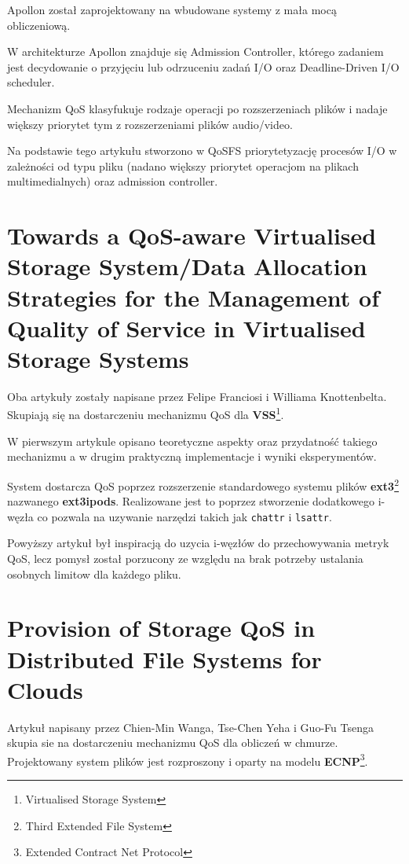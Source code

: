 Apollon został zaprojektowany na wbudowane systemy z mała mocą obliczeniową.

W architekturze Apollon znajduje się Admission Controller,
którego zadaniem jest decydowanie o przyjęciu lub odrzuceniu zadań I/O oraz
Deadline-Driven I/O scheduler.

Mechanizm QoS klasyfukuje rodzaje operacji po rozszerzeniach plików i nadaje większy
priorytet tym z rozszerzeniami plików audio/video.

Na podstawie tego artykułu stworzono w QoSFS priorytetyzację procesów I/O
w zależności od typu pliku (nadano większy priorytet operacjom na plikach multimedialnych) oraz admission controller.

\section{Towards a QoS-aware Virtualised Storage System/Data Allocation Strategies for the Management of Quality of Service in Virtualised Storage Systems}

Oba artykuły zostały napisane przez Felipe Franciosi i Williama Knottenbelta. 
Skupiają się na
dostarczeniu mechanizmu QoS dla \textbf{VSS}\footnote{Virtualised Storage System}.

W pierwszym artykule opisano teoretyczne aspekty oraz przydatność
takiego mechanizmu a w drugim praktyczną implementacje i wyniki eksperymentów.

System dostarcza QoS poprzez
rozszerzenie standardowego systemu plików \textbf{ext3}\footnote{Third Extended File System} nazwanego \textbf{ext3ipods}. Realizowane jest to poprzez stworzenie dodatkowego i-węzła co pozwala na uzywanie
narzędzi takich jak \texttt{chattr} i \texttt{lsattr}.

Powyższy artykuł był inspiracją do uzycia i-węzłów do przechowywania metryk QoS, lecz pomysł został porzucony ze względu na brak potrzeby 
ustalania osobnych limitow dla każdego pliku.

\section{Provision of Storage QoS in Distributed File Systems for Clouds}

Artykuł napisany przez Chien-Min Wanga, Tse-Chen Yeha i Guo-Fu Tsenga skupia sie na dostarczeniu mechanizmu QoS dla obliczeń w chmurze. Projektowany system plików jest rozproszony
i oparty na modelu \textbf{ECNP}\footnote{Extended Contract Net Protocol}.


